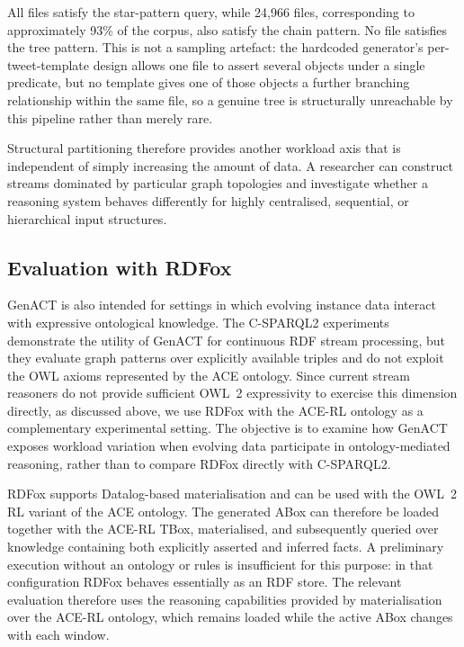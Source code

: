 All files satisfy the star-pattern query, while 24,966 files, corresponding to
approximately 93\% of the corpus, also satisfy the chain pattern. No file
satisfies the tree pattern. This is not a sampling artefact: the hardcoded
generator's per-tweet-template design allows one file to assert several
objects under a single predicate, but no template gives one of those objects a
further branching relationship within the same file, so a genuine tree is
structurally unreachable by this pipeline rather than merely rare.

Structural partitioning therefore provides another workload axis that is
independent of simply increasing the amount of data. A researcher can construct
streams dominated by particular graph topologies and investigate whether a
reasoning system behaves differently for highly centralised, sequential, or
hierarchical input structures.


\subsection{Evaluation with RDFox}
\label{subsec:genact-rdfox}

GenACT is also intended for settings in which evolving instance data interact
with expressive ontological knowledge. The C-SPARQL2 experiments demonstrate
the utility of GenACT for continuous RDF stream processing, but they evaluate
graph patterns over explicitly available triples and do not exploit the OWL
axioms represented by the ACE ontology. Since current stream reasoners do not
provide sufficient OWL~2 expressivity to exercise this dimension directly, as
discussed above, we use RDFox with the ACE-RL ontology
as a complementary experimental setting. The objective is to examine how
GenACT exposes workload variation when evolving data participate in
ontology-mediated reasoning, rather than to compare RDFox directly with
C-SPARQL2.

RDFox supports Datalog-based materialisation and can be used with the OWL~2 RL
variant of the ACE ontology. The generated ABox can therefore be loaded
together with the ACE-RL TBox, materialised, and subsequently queried over
knowledge containing both explicitly asserted and inferred facts. A
preliminary execution without an ontology or rules is insufficient for this
purpose: in that configuration RDFox behaves essentially as an RDF store. The
relevant evaluation therefore uses the reasoning capabilities provided by
materialisation over the ACE-RL ontology, which remains loaded while the
active ABox changes with each window.

